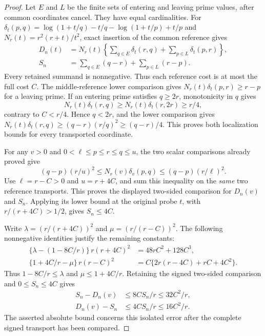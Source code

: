 \documentclass[11pt]{article}
\theoremstyle{definition}
\begin{document}
\begin{proof}
Let $E$ and $L$ be the finite sets of entering and leaving prime values,
after common coordinates cancel. They have equal cardinalities.
For $\delta_t(p,q)=\log(1+t/q)-t/q-\log(1+t/p)+t/p$ and
$N_r(t)=r^2(r+t)/t^2$, exact insertion of the common reference gives
\begin{align*}
 D_n(t)&=N_r(t)\left\{\sum_{q\in E}\delta_t(r,q)
                   +\sum_{p\in L}\delta_t(p,r)\right\},\\
 S_n&=\sum_{q\in E}(q-r)+\sum_{p\in L}(r-p).
\end{align*}
Every retained summand is nonnegative. Thus each reference cost is
at most the full cost $C$. The middle-reference lower comparison
gives $N_r(t)\delta_t(p,r)\ge r-p$ for a leaving prime.
If an entering prime satisfies $q\ge2r$, monotonicity in $q$ gives
\[
 N_r(t)\delta_t(r,q)\ge
 N_r(t)\delta_t(r,2r)\ge r/4,
\]
contrary to $C<r/4$. Hence $q<2r$, and the lower comparison gives
$N_r(t)\delta_t(r,q)\ge(q-r)(r/q)^2\ge(q-r)/4$.
This proves both localization bounds for every transported coordinate.

For any $v>0$ and $0<\ell\le p\le r\le q\le u$, the two scalar
comparisons already proved give
\[
 (q-p)(r/u)^2\le N_r(v)\delta_v(p,q)
               \le(q-p)(r/\ell)^2.
\]
Use $\ell=r-C>0$ and $u=r+4C$, and sum this inequality on the
\emph{same} two reference transports. This proves the displayed
two-sided comparison for $D_n(v)$ and $S_n$. Applying its lower
bound at the original probe $t$, with $r/(r+4C)>1/2$, gives $S_n\le4C$.

Write $\lambda=(r/(r+4C))^2$ and $\mu=(r/(r-C))^2$.
The following nonnegative identities justify the remaining constants:
\begin{align*}
 \{\lambda-(1-8C/r)\}\,r(r+4C)^2
   &=48rC^2+128C^3,\\
 \{1+4C/r-\mu\}\,r(r-C)^2
   &=C\{2r(r-4C)+rC+4C^2\}.
\end{align*}
Thus $1-8C/r\le\lambda$ and $\mu\le1+4C/r$.
Retaining the signed two-sided comparison and $0\le S_n\le4C$ gives
\begin{align*}
 S_n-D_n(v)&\le8CS_n/r\le32C^2/r,\\
 D_n(v)-S_n&\le4CS_n/r\le16C^2/r.
\end{align*}
The asserted absolute bound concerns this isolated error after the
complete signed transport has been compared.
\end{proof}
\end{document}
